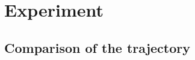 			\section{Experiment}
		\subsection{Comparison of the trajectory} \label{trajectoire path}
 
%  

